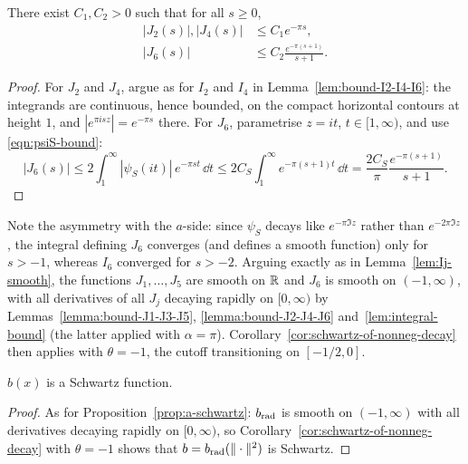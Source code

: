\begin{lemma}\label{lemma:bound-J2-J4-J6}
    There exist $C_1, C_2 > 0$ such that for all $s \geq 0$,
    \begin{align}
        |J_2(s)|, |J_4(s)| &\le C_1 e^{-\pi s}, \\
        |J_6(s)| &\le C_2 \frac{e^{-\pi (s + 1)}}{s + 1}.
    \end{align}
\end{lemma}
\begin{proof}
For $J_2$ and $J_4$, argue as for $I_2$ and $I_4$ in Lemma~\ref{lem:bound-I2-I4-I6}: the integrands are continuous, hence bounded, on the compact horizontal contours at height $1$, and $|e^{\pi i s z}| = e^{-\pi s}$ there. For $J_6$, parametrise $z = it$, $t \in [1, \infty)$, and use \eqref{eqn:psiS-bound}:
\[
    |J_6(s)| \le 2 \int_1^\infty |\psi_S(it)|\, e^{-\pi s t}\, \dd t \le 2 C_S \int_1^\infty e^{-\pi(s+1)t}\, \dd t = \frac{2C_S}{\pi} \frac{e^{-\pi(s+1)}}{s+1}.
\]
\end{proof}

Note the asymmetry with the $a$-side: since $\psi_S$ decays like $e^{-\pi \Im z}$ rather than $e^{-2\pi \Im z}$, the integral defining $J_6$ converges (and defines a smooth function) only for $s > -1$, whereas $I_6$ converged for $s > -2$. Arguing exactly as in Lemma~\ref{lem:Ij-smooth}, the functions $J_1, \ldots, J_5$ are smooth on $\mathbb{R}$ and $J_6$ is smooth on $(-1, \infty)$, with all derivatives of all $J_j$ decaying rapidly on $[0, \infty)$ by Lemmas~\ref{lemma:bound-J1-J3-J5}, \ref{lemma:bound-J2-J4-J6} and~\ref{lem:integral-bound} (the latter applied with $\alpha = \pi$). Corollary~\ref{cor:schwartz-of-nonneg-decay} then applies with $\theta = -1$, the cutoff transitioning on $[-1/2, 0]$.

\begin{proposition}\label{prop:b-schwartz}\leanok
$b(x)$ is a Schwartz function.
\end{proposition}
\begin{proof}
As for Proposition~\ref{prop:a-schwartz}: $b_{\mathrm{rad}}$ is smooth on $(-1, \infty)$ with all derivatives decaying rapidly on $[0, \infty)$, so Corollary~\ref{cor:schwartz-of-nonneg-decay} with $\theta = -1$ shows that $b = b_{\mathrm{rad}}(\|\cdot\|^2)$ is Schwartz.
\end{proof}

